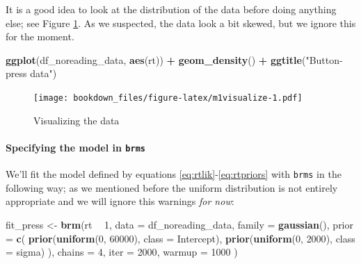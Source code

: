 \documentclass[12pt,]{krantz}
\newenvironment{Shaded}{\begin{snugshade}}{\end{snugshade}}
\newcommand{\KeywordTok}[1]{\textcolor[rgb]{0.13,0.29,0.53}{\textbf{#1}}}
\newcommand{\DataTypeTok}[1]{\textcolor[rgb]{0.13,0.29,0.53}{#1}}
\newcommand{\DecValTok}[1]{\textcolor[rgb]{0.00,0.00,0.81}{#1}}
\newcommand{\StringTok}[1]{\textcolor[rgb]{0.31,0.60,0.02}{#1}}
\newcommand{\OperatorTok}[1]{\textcolor[rgb]{0.81,0.36,0.00}{\textbf{#1}}}
\newcommand{\NormalTok}[1]{#1}
\let\oldparagraph\paragraph
\renewcommand{\paragraph}[1]{\oldparagraph{#1}\mbox{}}
\theoremstyle{definition}
\theoremstyle{definition}
\theoremstyle{definition}
\theoremstyle{remark}
\begin{document}
It is a good idea to look at the distribution of the data before doing
anything else; see Figure \ref{fig:m1visualize}. As we suspected, the
data look a bit skewed, but we ignore this for the moment.

\begin{Shaded}
\begin{Highlighting}[]
\KeywordTok{ggplot}\NormalTok{(df_noreading_data, }\KeywordTok{aes}\NormalTok{(rt)) }\OperatorTok{+}
\StringTok{  }\KeywordTok{geom_density}\NormalTok{() }\OperatorTok{+}
\StringTok{  }\KeywordTok{ggtitle}\NormalTok{(}\StringTok{"Button-press data"}\NormalTok{)}
\end{Highlighting}
\end{Shaded}

\begin{figure}
\centering
\texttt{[image: bookdown\_files/figure-latex/m1visualize-1.pdf]}
\caption{\label{fig:m1visualize}Visualizing the data}
\end{figure}

\paragraph{\texorpdfstring{Specifying the model in
\texttt{brms}}{Specifying the model in brms}}\label{specifying-the-model-in-brms}

We'll fit the model defined by equations
\eqref{eq:rtlik}-\eqref{eq:rtpriors} with \texttt{brms} in the following
way; as we mentioned before the uniform distribution is not entirely
appropriate and we will ignore this warnings \emph{for now}:

\begin{Shaded}
\begin{Highlighting}[]
\NormalTok{fit_press <-}\StringTok{ }\KeywordTok{brm}\NormalTok{(rt }\OperatorTok{~}\StringTok{ }\DecValTok{1}\NormalTok{,}
  \DataTypeTok{data =}\NormalTok{ df_noreading_data,}
  \DataTypeTok{family =} \KeywordTok{gaussian}\NormalTok{(),}
  \DataTypeTok{prior =} \KeywordTok{c}\NormalTok{(}
    \KeywordTok{prior}\NormalTok{(}\KeywordTok{uniform}\NormalTok{(}\DecValTok{0}\NormalTok{, }\DecValTok{60000}\NormalTok{), }\DataTypeTok{class =}\NormalTok{ Intercept),}
    \KeywordTok{prior}\NormalTok{(}\KeywordTok{uniform}\NormalTok{(}\DecValTok{0}\NormalTok{, }\DecValTok{2000}\NormalTok{), }\DataTypeTok{class =}\NormalTok{ sigma)}
\NormalTok{  ),}
  \DataTypeTok{chains =} \DecValTok{4}\NormalTok{,}
  \DataTypeTok{iter =} \DecValTok{2000}\NormalTok{,}
  \DataTypeTok{warmup =} \DecValTok{1000}
\NormalTok{)}
\end{Highlighting}
\end{Shaded}
\end{document}

